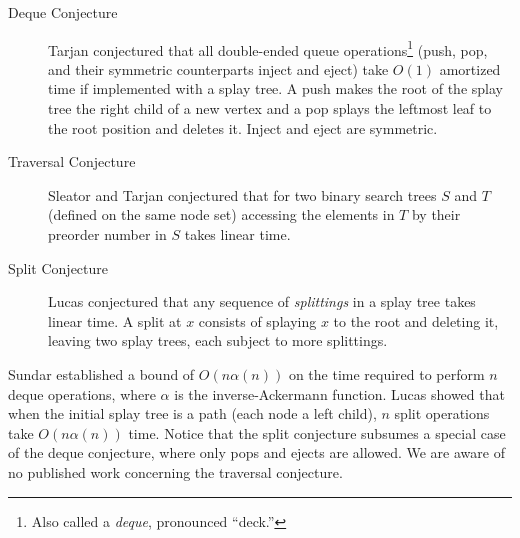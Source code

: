 \documentclass{article}
\begin{document}
\begin{description}
\item[Deque Conjecture] Tarjan \cite{Tar85} conjectured that all double-ended queue operations\footnote{Also called a {\em deque}, pronounced ``deck.''} 
(push, pop, and their symmetric counterparts
inject and eject) take $O(1)$ amortized time if implemented with a splay tree.  A push makes the root of the splay tree the right child of a new vertex
and a pop splays the leftmost leaf to the root position and deletes it.  Inject and eject are symmetric.

\item[Traversal Conjecture] Sleator and Tarjan \cite{ST85} conjectured that for two binary search trees $S$ and $T$ (defined on the same node set)
accessing the elements in $T$ by their preorder number in $S$ takes linear time.

\item[Split Conjecture] Lucas conjectured \cite{Lucas91} 
that any sequence of {\em splittings} in a splay tree takes linear time.  A split at $x$ consists of splaying
$x$ to the root and deleting it, leaving two splay trees, each subject to more splittings.
\end{description}

Sundar \cite{Sundar92} established a bound of $O(n\alpha(n))$ on the time required to perform $n$ deque operations, 
where $\alpha$ is the inverse-Ackermann function.  
Lucas \cite{Lucas91} showed that when the initial splay tree is a path (each node a left child), 
$n$ split operations take $O(n\alpha(n))$ time.  Notice that the split conjecture subsumes
a special case of the deque conjecture, where only pops and ejects are allowed.  We are aware of no published 
work concerning the traversal conjecture.
\end{document}
